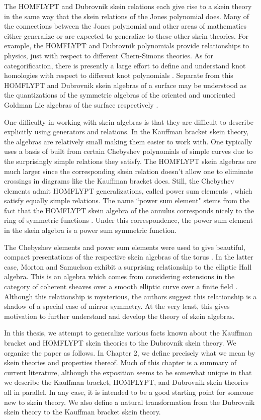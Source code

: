 The HOMFLYPT and Dubrovnik skein relations each give rise to a skein theory in the same way that the skein relations of the Jones polynomial does. Many of the connections between the Jones polynomial and other areas of mathematics either generalize or are expected to generalize to these other skein theories. For example, the HOMFLYPT and Dubrovnik polynomials provide relationships to physics, just with respect to different Chern-Simons theories. As for categorification, there is presently a large effort to define and understand knot homologies with respect to different knot polynomials \cite{KR08, Web17}. Separate from this HOMFLYPT and Dubrovnik skein algebras of a surface may be understood as the quantizations of the symmetric algebras of the oriented and unoriented Goldman Lie algebras of the surface respectively \cite{Tur91}. 

One difficulty in working with skein algebras is that they are difficult to describe explicitly using generators and relations. In the Kauffman bracket skein theory, the algebras are relatively small making them easier to work with. One typically uses a basis of built from certain Chebyshev polynomials of simple curves due to the surprisingly simple relations they satisfy. The HOMFLYPT skein algebras are much larger since the corresponding skein relation doesn't allow one to eliminate crossings in diagrams like the Kauffman bracket does. Still, the Chebyshev elements admit HOMFLYPT generalizations, called power sum elements \cite{Mor02b}, which satisfy equally simple relations. The name ``power sum element" stems from the fact that the HOMFLYPT skein algebra of the annulus corresponds nicely to the ring of symmetric functions \cite{Luk05}. Under this correspondence, the power sum element in the skein algebra is a power sum symmetric function. 

The Chebyshev elements and power sum elements were used to give beautiful, compact presentations of the respective skein algebras of the torus \cite{FG00, MS17}. In the latter case, Morton and Samuelson exhibit a surprising relationship to the elliptic Hall algebra. This is an algebra which comes from considering extensions in the category of coherent sheaves over a smooth elliptic curve over a finite field \cite{BS12}. Although this relationship is mysterious, the authors suggest this relationship is a shadow of a special case of mirror symmetry. At the very least, this gives motivation to further understand and develop the theory of skein algebras.

In this thesis, we attempt to generalize various facts known about the Kauffman bracket and HOMFLYPT skein theories to the Dubrovnik skein theory. We organize the paper as follows. In Chapter 2, we define precisely what we mean by skein theories and properties thereof. Much of this chapter is a summary of current literature, although the exposition seems to be somewhat unique in that we describe the Kauffman bracket, HOMFLYPT, and Dubrovnik skein theories all in parallel. In any case, it is intended to be a good starting point for someone new to skein theory. We also define a natural transformation from the Dubrovnik skein theory to the Kauffman bracket skein theory. 

